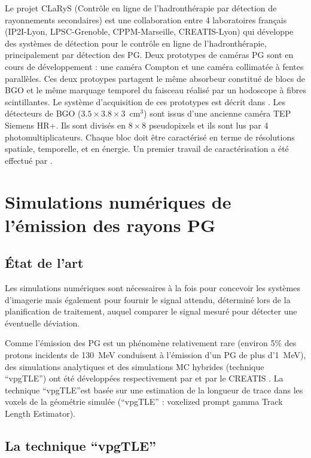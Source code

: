 \documentclass[11pt,a4paper,oldfontcommands]{memoir}
\begin{document}
Le projet CLaRyS (Contrôle en ligne de l’hadronthérapie par détection de rayonnements secondaires) est une collaboration entre 4 laboratoires français (IP2I-Lyon, LPSC-Grenoble, CPPM-Marseille, CREATIS-Lyon) qui développe des systèmes de détection pour le contrôle en ligne de l'hadronthérapie, principalement par détection des PG. Deux prototypes de caméras PG sont en cours de développement : une caméra Compton et une caméra collimatée à fentes parallèles. Ces deux protoypes partagent le même absorbeur constitué de blocs de BGO et le même marquage temporel du faisceau réalisé par un hodoscope à fibres scintillantes. Le système d'acquisition de ces prototypes est décrit dans \cite{Caplan_2019}. Les détecteurs de BGO ($3.5 \times 3.8 \times 3$~cm$^3$) sont issus d'une ancienne caméra TEP Siemens HR+. Ils sont divisés en $8\times8$ pseudopixels et ils sont lus par 4 photomultiplicateurs. Chaque bloc doit être caractérisé en terme de résolutions spatiale, temporelle, et en énergie. Un premier travail de caractérisation a été effectué par \cite{Fontana_2018}.




\section{Simulations numériques de l'émission des rayons PG}

\subsection{\'Etat de l'art}

Les simulations numériques sont nécessaires à la fois pour concevoir les systèmes d'imagerie mais également pour fournir le signal attendu, déterminé lors de la planification de traitement, auquel comparer le signal mesuré pour détecter une éventuelle déviation.

Comme l'émission des PG est un phénomène relativement rare (environ 5\% des protons incidents de 130~MeV conduisent à l'émission d'un PG de plus d'1~MeV), des simulations analytiques et des simulations MC hybrides (technique \enquote{vpgTLE}) ont été développées respectivement par \cite{Sterpin_2015} et par le CREATIS \cite{Huisman_2016}. La technique \enquote{vpgTLE}est basée sur une estimation de la longueur de trace dans les voxels de la géométrie simulée (\enquote{vpgTLE} : voxelized prompt gamma Track Length Estimator).

\subsection{La technique \enquote{vpgTLE}}
\end{document}
